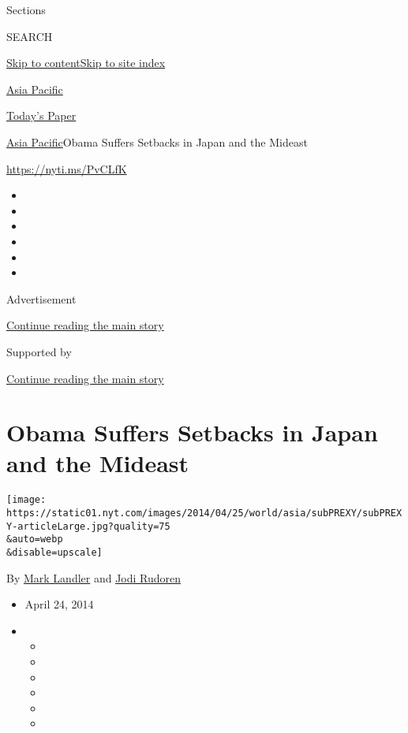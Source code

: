 Sections

SEARCH

\protect\hyperlink{site-content}{Skip to
content}\protect\hyperlink{site-index}{Skip to site index}

\href{https://www.nytimes.com/section/world/asia}{Asia Pacific}

\href{https://myaccount.nytimes.com/auth/login?response_type=cookie\&client_id=vi}{}

\href{https://www.nytimes.com/section/todayspaper}{Today's Paper}

\href{/section/world/asia}{Asia Pacific}\textbar{}Obama Suffers Setbacks
in Japan and the Mideast

\url{https://nyti.ms/PvCLfK}

\begin{itemize}
\item
\item
\item
\item
\item
\item
\end{itemize}

Advertisement

\protect\hyperlink{after-top}{Continue reading the main story}

Supported by

\protect\hyperlink{after-sponsor}{Continue reading the main story}

\hypertarget{obama-suffers-setbacks-in-japan-and-the-mideast}{%
\section{Obama Suffers Setbacks in Japan and the
Mideast}\label{obama-suffers-setbacks-in-japan-and-the-mideast}}

\texttt{[image: https://static01.nyt.com/images/2014/04/25/world/asia/subPREXY/subPREXY-articleLarge.jpg?quality=75\\\&auto=webp\\\&disable=upscale]}

By \href{http://www.nytimes.com/by/mark-landler}{Mark Landler} and
\href{http://www.nytimes.com/by/jodi-rudoren}{Jodi Rudoren}

\begin{itemize}
\item
  April 24, 2014
\item
  \begin{itemize}
  \item
  \item
  \item
  \item
  \item
  \item
  \end{itemize}
\end{itemize}

